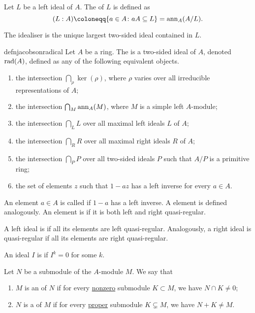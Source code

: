 \documentclass[12pt]{article}
\begin{document}
\begin{defn}
	Let $L$ be a left ideal of $A$. The  of $L$ is defined as
	\begin{equation*} 
		(L : A) \coloneqq \{a \in A \colon aA \subset L\} = \ann_{A}(A/L).
	\end{equation*} 
\end{defn}
The idealiser is the unique largest two-sided ideal contained in $L$.

\begin{restatable}[]{defn}{jacobsonradical} \label{defn:jacobson-radical}
	Let $A$ be a ring. 
	The  is a two-sided ideal of $A$, denoted $\operatorname{rad}(A)$, defined as any of the following equivalent objects.
	\begin{enumerate}[label=(\alph*)]
		\item the intersection $\bigcap_{\rho} \ker(\rho)$, where $\rho$ varies over all irreducible representations of $A$;
		\item the intersection $\bigcap_{M} \operatorname{ann}_{A}(M)$, where $M$ is a simple left $A$-module;
		\item the intersection $\bigcap_{L} L$ over all maximal left ideals $L$ of $A$;
		\item the intersection $\bigcap_{R} R$ over all maximal right ideals $R$ of $A$;
		\item the intersection $\bigcap_{P} P$ over all two-sided ideals $P$ such that $A/P$ is a primitive ring;
		\item the set of elements $z$ such that $1 - az$ has a left inverse for every $a \in A$.
	\end{enumerate}	
\end{restatable}

\begin{defn}
	An element $a \in A$ is called  if $1 - a$ has a left inverse. 
	A  element is defined analogously. 
	An element is  if it is both left and right quasi-regular. 

	A left ideal is  if all its elements are left quasi-regular. Analogously, a right ideal is quasi-regular if all its elements are right quasi-regular.
\end{defn}

\begin{defn}
	An ideal $I$ is  if $I^{k} = 0$ for some $k$.
\end{defn}

\begin{defn}
	Let $N$ be a submodule of the $A$-module $M$. We say that
	\begin{enumerate}[label=(\alph*)]
		\item $M$ is an  of $N$ if for every \underline{nonzero} submodule $K \subset M$, we have $N \cap K \neq 0$;
		\item $N$ is a  of $M$ if for every \underline{proper} submodule $K \subsetneq M$, we have $N + K \neq M$.
	\end{enumerate}
\end{defn}
\end{document}

